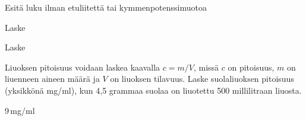 \begin{tehtavasivu}

\begin{tehtava}
Esitä luku ilman etuliitettä tai kymmenpotenssimuotoa
\begin{alakohdat}
\end{alakohdat}
\begin{vastaus}
\begin{alakohdat}
\end{alakohdat}
\end{vastaus}
\end{tehtava}

\begin{tehtava}
Laske
\begin{alakohdat}
\end{alakohdat}
\begin{vastaus}
\begin{alakohdat}
\end{alakohdat}
\end{vastaus}
\end{tehtava}

\begin{tehtava}
Laske
\begin{alakohdat}
\end{alakohdat}
\begin{vastaus}
\begin{alakohdat}
\end{alakohdat}
\end{vastaus}
\end{tehtava}

\begin{tehtava}
Liuoksen pitoisuus voidaan laskea kaavalla $c=m/V$, missä $c$ on pitoisuus, $m$ on liuenneen aineen määrä ja $V$ on liuoksen tilavuus. Laske suolaliuoksen pitoisuus (yksikkönä mg/ml), kun 4,5 grammaa suolaa on liuotettu 500 millilitraan liuosta.
\begin{vastaus}
9\,mg/ml
\end{vastaus}
\end{tehtava}


\end{tehtavasivu}
